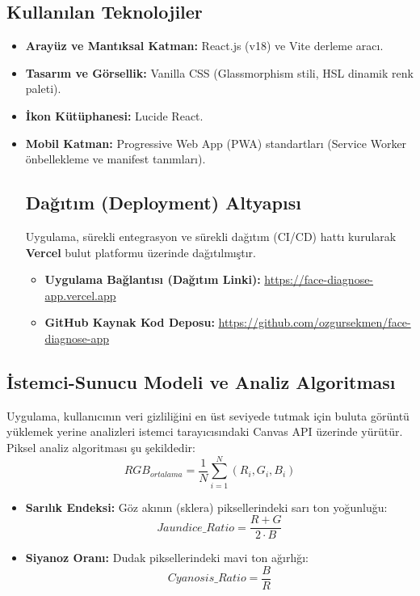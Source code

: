 \documentclass[12pt,a4paper]{article}
\begin{document}
\subsection{Kullanılan Teknolojiler}
\begin{itemize}
    \item \textbf{Arayüz ve Mantıksal Katman:} React.js (v18) ve Vite derleme aracı.
    \item \textbf{Tasarım ve Görsellik:} Vanilla CSS (Glassmorphism stili, HSL dinamik renk paleti).
    \item \textbf{İkon Kütüphanesi:} Lucide React.
    \item \textbf{Mobil Katman:} Progressive Web App (PWA) standartları (Service Worker önbellekleme ve manifest tanımları).
    \subsection{Dağıtım (Deployment) Altyapısı}
    Uygulama, sürekli entegrasyon ve sürekli dağıtım (CI/CD) hattı kurularak \textbf{Vercel} bulut platformu üzerinde dağıtılmıştır. 
    \begin{itemize}
        \item \textbf{Uygulama Bağlantısı (Dağıtım Linki):} \url{https://face-diagnose-app.vercel.app}
        \item \textbf{GitHub Kaynak Kod Deposu:} \url{https://github.com/ozgursekmen/face-diagnose-app}
    \end{itemize}
\end{itemize}

\subsection{İstemci-Sunucu Modeli ve Analiz Algoritması}
Uygulama, kullanıcının veri gizliliğini en üst seviyede tutmak için buluta görüntü yüklemek yerine analizleri istemci tarayıcısındaki Canvas API üzerinde yürütür. Piksel analiz algoritması şu şekildedir:
\begin{equation}
RGB_{ortalama} = \frac{1}{N} \sum_{i=1}^{N} (R_i, G_i, B_i)
\end{equation}
\begin{itemize}
    \item \textbf{Sarılık Endeksi:} Göz akının (sklera) piksellerindeki sarı ton yoğunluğu:
    \begin{equation}
    Jaundice\_Ratio = \frac{R + G}{2 \cdot B}
    \end{equation}
    \item \textbf{Siyanoz Oranı:} Dudak piksellerindeki mavi ton ağırlığı:
    \begin{equation}
    Cyanosis\_Ratio = \frac{B}{R}
    \end{equation}
\end{itemize}
\end{document}
